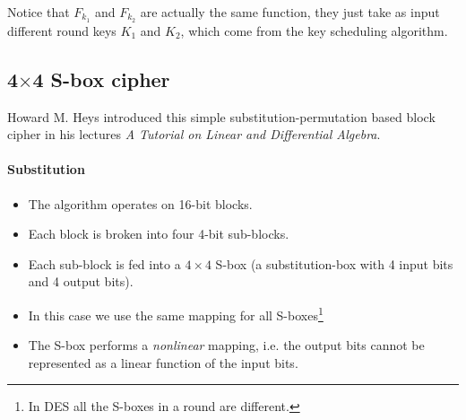 \documentclass{article}
\begin{document}
  \begin{center}
  \end{center}

  Notice that $F_{k_{1}}$ and $F_{k_{2}}$ are actually the same
  function, they just take as input different round keys $K_{1}$ and
  $K_{2}$, which come from the key scheduling algorithm.
  

  \subsection{4$\times$4 S-box cipher}

  Howard M. Heys introduced this simple substitution-permutation based block 
  cipher in his lectures \emph{A Tutorial on Linear and Differential Algebra}.

  \paragraph{Substitution}
  \begin{itemize}
	\item The algorithm operates on 16-bit blocks.
	\item Each block is broken into four 4-bit sub-blocks.
	\item Each sub-block is fed into a $4\times4$ S-box (a
	  substitution-box with 4 input bits and 4 output bits). 
	\item In this case we use the same mapping for all
	  S-boxes\footnote{In DES all the S-boxes in a round are
	  different.}
	\item The S-box performs a \emph{nonlinear} mapping, i.e. the
	  output bits cannot be represented as a linear function of the
	  input bits.
  \end{itemize}
\end{document}

